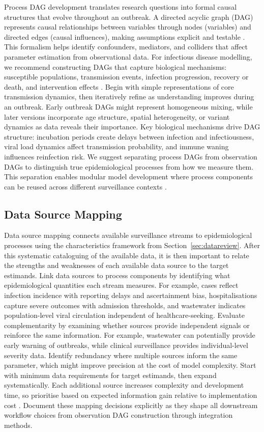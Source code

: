 \documentclass{article}
\begin{document}
Process DAG development translates research questions into formal causal structures that evolve throughout an outbreak.
A directed acyclic graph (DAG) represents causal relationships between variables through nodes (variables) and directed edges (causal influences), making assumptions explicit and testable \citep{digitale2022tutorial}.
This formalism helps identify confounders, mediators, and colliders that affect parameter estimation from observational data.
For infectious disease modelling, we recommend constructing DAGs that capture biological mechanisms: susceptible populations, transmission events, infection progression, recovery or death, and intervention effects \citep{deangelis2018analysing}.
Begin with simple representations of core transmission dynamics, then iteratively refine as understanding improves during an outbreak.
Early outbreak DAGs might represent homogeneous mixing, while later versions incorporate age structure, spatial heterogeneity, or variant dynamics as data reveals their importance.
Key biological mechanisms drive DAG structure: incubation periods create delays between infection and infectiousness, viral load dynamics affect transmission probability, and immune waning influences reinfection risk.
We suggest separating process DAGs from observation DAGs to distinguish true epidemiological processes from how we measure them.
This separation enables modular model development where process components can be reused across different surveillance contexts \citep{nicholson2022interoperability}.

\subsection{Data Source Mapping}

Data source mapping connects available surveillance streams to epidemiological processes using the characteristics framework from Section~\ref{sec:datareview}.
After this systematic cataloguing of the available data,  it is then important to relate the strengths and weaknesses of each available data source to the target estimands.
Link data sources to process components by identifying what epidemiological quantities each stream measures. 
For example, cases reflect infection incidence with reporting delays and ascertainment bias, hospitalisations capture severe outcomes with admission thresholds, and wastewater indicates population-level viral circulation independent of healthcare-seeking.
Evaluate complementarity by examining whether sources provide independent signals or reinforce the same information.
For example, wastewater can potentially provide early warning of outbreaks, while clinical surveillance provides individual-level severity data.
Identify redundancy where multiple sources inform the same parameter, which might improve precision at the cost of model complexity.
Start with minimum data requirements for target estimands, then expand systematically.
Each additional source increases complexity and development time, so prioritise based on expected information gain relative to implementation cost \citep{jackson2019value,heath2024value}.
Document these mapping decisions explicitly as they shape all downstream workflow choices from observation DAG construction through integration methods.
\end{document}
